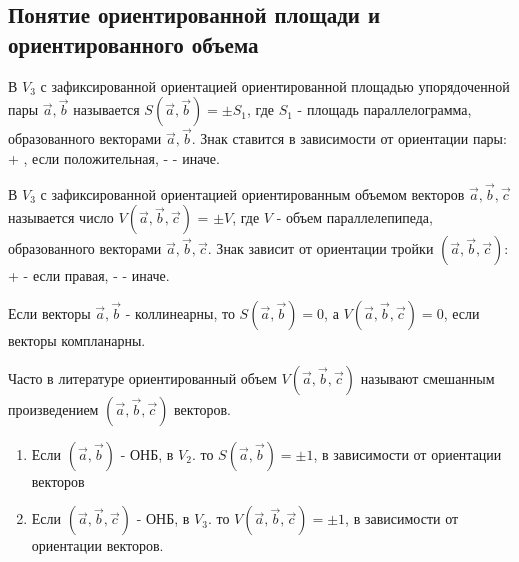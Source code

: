 \subsection{Понятие ориентированной площади и ориентированного объема}

\begin{definition}
	В $V_3$ с зафиксированной ориентацией ориентированной площадью упорядоченной пары $\vec{a}, \vec{b}$ называется $S(\vec{a}, \vec{b}) = \pm S_1$, где $S_1$ - площадь параллелограмма, образованного векторами $\vec{a}, \vec{b}$. 
	Знак ставится в зависимости от ориентации пары: + , если положительная, - - иначе.
\end{definition}

\begin{definition}
	В $V_3$ с зафиксированной ориентацией ориентированным объемом векторов $\vec{a}, \vec{b}, \vec{c}$ называется число $V(\vec{a}, \vec{b}, \vec{c})$ = $\pm V$, где $V$ - объем параллелепипеда, образованного векторами
	$\vec{a}, \vec{b}, \vec{c}$. Знак зависит от ориентации тройки $(\vec{a}, \vec{b}, \vec{c})$: + - если правая, - - иначе.
\end{definition}

\begin{note}
	Если векторы $\vec{a}, \vec{b}$ - коллинеарны, то $S(\vec{a},\vec{b}) = 0$, а $V(\vec{a},\vec{b},\vec{c}) = 0$, если векторы компланарны. 
\end{note}

\begin{note}
	Часто в литературе ориентированный объем $V(\vec{a}, \vec{b}, \vec{c})$ называют смешанным произведением $(\vec{a}, \vec{b}, \vec{c})$ векторов.
\end{note}

\begin{proposition}
	\begin{enumerate}[]
		
		\item  Если $(\vec{a},\vec{b})$ - ОНБ, в $V_2$. то $S(\vec{a},\vec{b}) = \pm 1$, в зависимости от ориентации векторов
	
		\item  Если $(\vec{a},\vec{b},\vec{c})$ - ОНБ, в $V_3$. то $V(\vec{a},\vec{b},\vec{c}) = \pm 1$, в зависимости от ориентации векторов.
	\end{enumerate}
\end{proposition}

